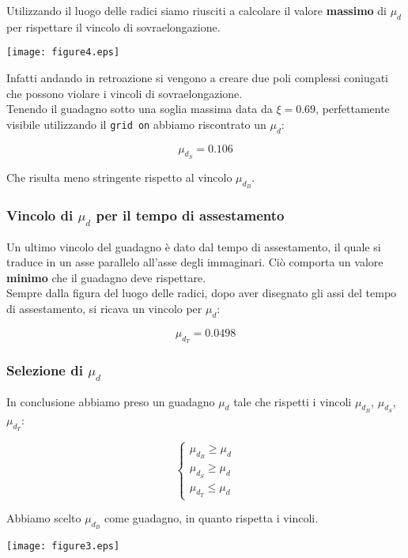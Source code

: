 \documentclass{article}
\begin{document}
Utilizzando il luogo delle radici siamo riusciti a calcolare il valore \textbf{massimo} di $\mu_d$ per rispettare il vincolo di sovraelongazione.

\begin{center}
    \texttt{[image: figure4.eps]}
\end{center}
Infatti andando in retroazione si vengono a creare due poli complessi coniugati che possono violare i vincoli di sovraelongazione.\\
Tenendo il guadagno sotto una soglia massima data da $\xi=0.69$, perfettamente visibile utilizzando il \texttt{grid on} abbiamo riscontrato un $\mu_d$:

$$
    \mu_{d_S} = 0.106
$$

Che risulta meno stringente rispetto al vincolo $\mu_{d_B}$.

\subsubsection{Vincolo di $\mu_d$ per il tempo di assestamento}

Un ultimo vincolo del guadagno è dato dal tempo di assestamento, il quale si traduce in un asse parallelo all'asse degli immaginari. Ciò comporta un valore \textbf{minimo} che il guadagno deve rispettare.\\

Sempre dalla figura del luogo delle radici, dopo aver disegnato gli assi del tempo di assestamento, si ricava un vincolo per $\mu_d$:

$$
    \mu_{d_T} = 0.0498
$$

\newpage

\subsubsection{Selezione di $\mu_d$}

In conclusione abbiamo preso un guadagno $\mu_d$ tale che rispetti i vincoli $\mu_{d_B}$, $\mu_{d_S}$, $\mu_{d_T}$:

$$
\begin{cases}
    \mu_{d_B}\geq\mu_d\\
    \mu_{d_S}\geq\mu_d\\
    \mu_{d_T}\leq\mu_d
\end{cases}
$$

Abbiamo scelto $\mu_{d_B}$ come guadagno, in quanto rispetta i vincoli.


\begin{center}
    \texttt{[image: figure3.eps]}
\end{center}
\end{document}
